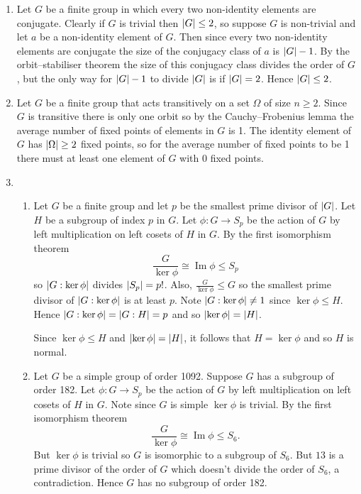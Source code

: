 \documentclass[a4paper, 12pt]{article}
\DeclarePairedDelimiter\abs{\lvert}{\rvert}
\DeclareMathOperator{\im}{Im}
\begin{document}
\begin{enumerate}

\item Let \(G\) be a finite group in which every two non-identity elements are conjugate. Clearly if \(G\) is trivial then \(\abs{G}\leq2\), so suppose \(G\) is non-trivial and let \(a\) be a non-identity element of \(G\). Then since every two non-identity elements are conjugate the size of the conjugacy class of \(a\) is \(\abs{G}-1\). By the orbit--stabiliser theorem the size of this conjugacy class divides the order of \(G\), but the only way for \(\abs{G}-1\) to divide \(\abs{G}\) is if \(\abs{G}=2\). Hence \(\abs{G}\leq2\).

\item Let \(G\) be a finite group that acts transitively on a set \(\Omega\) of size \(n\geq2\). Since \(G\) is transitive there is only one orbit so by the Cauchy--Frobenius lemma the average number of fixed points of elements in \(G\) is 1. The identity element of \(G\) has \(\abs\Omega\geq2\) fixed points, so for the average number of fixed points to be 1 there must at least one element of \(G\) with 0 fixed points.

\item \begin{enumerate}

\item Let \(G\) be a finite group and let \(p\) be the smallest prime divisor of \(\abs{G}\). Let \(H\) be a subgroup of index \(p\) in \(G\). Let \(\phi\colon G\to S_p\) be the action of \(G\) by left multiplication on left cosets of \(H\) in \(G\). By the first isomorphism theorem
\[\frac{G}{\ker\phi}\cong\im\phi\leq S_p\]
so \(\abs{G:\ker\phi}\) divides \(\abs{S_p}=p!\). Also, \(\frac G{\ker\phi}\leq G\) so the smallest prime divisor of \(\abs{G:\ker\phi}\) is at least \(p\). Note \(\abs{G:\ker\phi}\neq1\)  since \(\ker\phi\leq H\). Hence \(\abs{G:\ker\phi}=\abs{G:H}=p\) and so \(\abs{\ker\phi}=\abs{H}\).

Since \(\ker\phi\leq H\) and \(\abs{\ker\phi}=\abs{H}\), it follows that \(H=\ker\phi\) and so \(H\) is normal.

\item Let \(G\) be a simple group of order 1092. Suppose \(G\) has a subgroup of order 182. Let \(\phi\colon G\to S_p\) be the action of \(G\) by left multiplication on left cosets of \(H\) in \(G\). Note since \(G\) is simple \(\ker\phi\) is trivial. By the first isomorphism theorem
\[\frac{G}{\ker\phi}\cong\im\phi\leq S_6.\]
But \(\ker\phi\) is trivial so \(G\) is isomorphic to a subgroup of \(S_6\). But \(13\) is a prime divisor of the order of \(G\) which doesn't divide the order of \(S_6\), a contradiction. Hence \(G\) has no subgroup of order 182.


\end{enumerate}
\end{enumerate}
\end{document}
